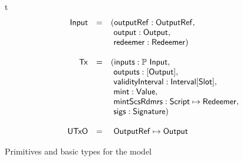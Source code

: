 \begin{ruledfigure}{t}
\begin{displaymath}
\begin{array}{rll}
    \textsf{Input} &=&( \mathsf{outputRef}: \sf{OutputRef},\\
                & &\ \mathsf{output}: \mathsf{Output}, \\
                & &\ \mathsf{redeemer}: \mathsf{Redeemer})\\
    \\
    \mathsf{Tx} &=&(\mathsf{inputs}: \mathbb{P}~\textsf{Input},\\
               & &\ \mathsf{outputs}: [\mathsf{Output}],\\
               & &\ \mathsf{validityInterval}: \textsf{Interval}[\textsf{Slot}],\\
               & &\ \mathsf{mint}: \mathsf{Value},\\
               & &\ \mathsf{mintScsRdmrs}: \textsf{Script} \mapsto \mathsf{Redeemer},\\
               & &\ \mathsf{sigs}: \textsf{Signature})\\
    \\
    \mathsf{UTxO} &=&\ \mathsf{OutputRef} \mapsto \mathsf{Output} \\
    \end{array}
  \end{displaymath}
  \caption{Primitives and basic types for the \EUTXOma{} model}
  \label{fig:eutxo-types}
\end{ruledfigure}
%
